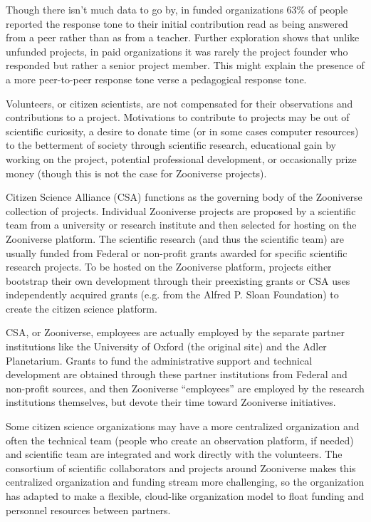 Though there isn't much data to go by, in funded organizations 63\% of people reported the response tone to their initial contribution read as being answered from a peer rather than as from a teacher. Further exploration shows that unlike unfunded projects, in paid organizations it was rarely the project founder who responded but rather a senior project member. This might explain the presence of a more peer-to-peer response tone verse a pedagogical response tone.


Volunteers, or citizen scientists, are not compensated for their observations and contributions to a project. Motivations to contribute to projects may be out of scientific curiosity, a desire to donate time (or in some cases computer resources) to the betterment of society through scientific research, educational gain by working on the project, potential professional development, or occasionally prize money (though this is not the case for Zooniverse projects).
 
Citizen Science Alliance (CSA) functions as the governing body of the Zooniverse collection of projects. Individual Zooniverse projects are proposed by a scientific team from a university or research institute and then selected for hosting on the Zooniverse platform. The scientific research (and thus the scientific team) are usually funded from Federal or non-profit grants awarded for specific scientific research projects. To be hosted on the Zooniverse platform, projects either bootstrap their own development through their preexisting grants or CSA uses independently acquired grants (e.g. from the Alfred P. Sloan Foundation) to create the citizen science platform.
 
CSA, or Zooniverse, employees are actually employed by the separate partner institutions like the University of Oxford (the original site) and the Adler Planetarium. Grants to fund the administrative support and technical development are obtained through these partner institutions from Federal and non-profit sources, and then Zooniverse “employees” are employed by the research institutions themselves, but devote their time toward Zooniverse initiatives.
 
Some citizen science organizations may have a more centralized organization and often the technical team (people who create an observation platform, if needed) and scientific team are integrated and work directly with the volunteers. The consortium of scientific collaborators and projects around Zooniverse makes this centralized organization and funding stream more challenging, so the organization has adapted to make a flexible, cloud-like organization model to float funding and personnel resources between partners.


